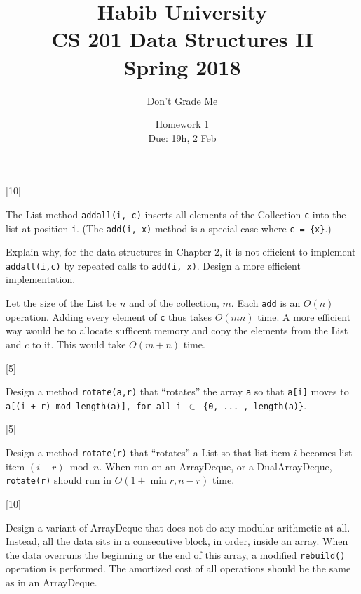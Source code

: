 \documentclass[addpoints]{exam}
\title{Habib University\\CS 201 Data Structures II\\Spring 2018}
\author{Don't Grade Me}  %
\date{Homework 1\\Due: 19h, 2 Feb}
\begin{document}
\maketitle

\begin{questions}

[10]

The List method {\tt add\textunderscore all(i, c)} inserts all elements of the Collection {\tt c} into the list at position {\tt i}. (The {\tt add(i, x)} method is a special case where {\tt c = \{x\}}.)

Explain why, for the data structures in Chapter 2, it is not efficient to implement {\tt add\textunderscore all(i,c)} by repeated calls to {\tt add(i, x)}. Design a more efficient implementation.
\begin{solution}
  Let the size of the List be $n$ and of the collection, $m$. Each {\tt add} is an $O(n)$ operation. Adding every element of {\tt c} thus takes $O(mn)$ time. A more efficient way would be to allocate sufficent memory and copy the elements from the List and $c$ to it. This would take $O(m+n)$ time.
\end{solution}

[5]

Design a method {\tt rotate(a,r)} that ``rotates'' the array {\tt a} so that {\tt a[i]} moves to {\tt a[(i + r) mod length(a)], for all i $\in$ \{0, ... ,  length(a)\}}.
\begin{solution}
\end{solution}

[5]

Design a method {\tt rotate(r)} that ``rotates'' a List so that list item $i$ becomes list item $(i + r) \bmod n$. When run on an ArrayDeque, or a DualArrayDeque, {\tt rotate(r)} should run in $O(1 + \min{r, n-r})$ time.
\begin{solution}
\end{solution}

[10]

Design a variant of ArrayDeque that does not do any modular arithmetic at all. Instead, all the data sits in a consecutive block, in order, inside an array. When the data overruns the beginning or the end of this array, a modified {\tt rebuild()} operation is performed. The amortized cost of all operations should be the same as in an ArrayDeque.


\end{questions}
\end{document}
